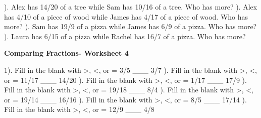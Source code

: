 \documentclass{article}%
\begin{document}
\newline%
). Alex has 14/20 of a tree while Sam has 10/16 of a tree. Who has more?%
\newline%
\newline%
). Alex has 4/10 of a piece of wood while James has 4/17 of a piece of wood. Who has more?%
\newline%
\newline%
). Sam has 19/9 of a pizza while James has 6/9 of a pizza. Who has more?%
\newline%
\newline%
). Laura has 6/15 of a pizza while Rachel has 16/7 of a pizza. Who has more?%
\newline%
\newline%
\newline%
\pagebreak%
\large%
\begin{center}%
\textbf{Comparing Fractions- Worksheet 4}%
\newline%
\newline%
\newline%
\end{center} \normalsize%
1). Fill in the blank with >, <, or = 3/5 \_\_\_ 3/7%
\newline%
\newline%
). Fill in the blank with >, <, or = 11/17 \_\_\_ 14/20%
\newline%
\newline%
). Fill in the blank with >, <, or = 1/17 \_\_\_ 17/9%
\newline%
\newline%
). Fill in the blank with >, <, or = 19/18 \_\_\_ 8/4%
\newline%
\newline%
). Fill in the blank with >, <, or = 19/14 \_\_\_ 16/16%
\newline%
\newline%
). Fill in the blank with >, <, or = 8/5 \_\_\_ 17/14%
\newline%
\newline%
). Fill in the blank with >, <, or = 12/9 \_\_\_ 4/8%
\end{document}

